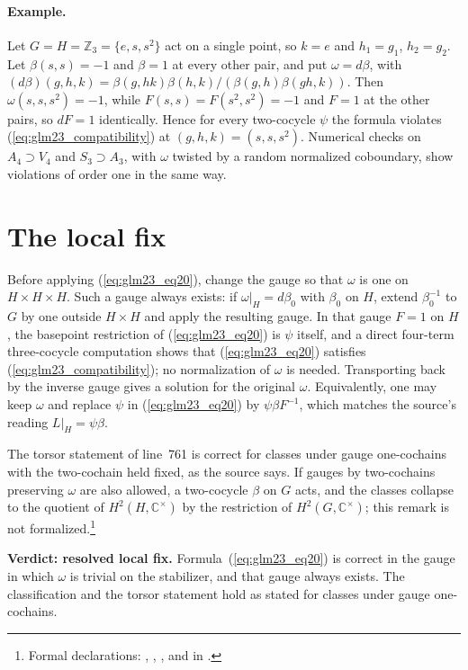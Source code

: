 \documentclass{article}
\begin{document}
\paragraph{Example.} Let $G=H=\mathbb Z_3=\{e,s,s^2\}$ act on a single
point, so $k=e$ and $h_1=g_1$, $h_2=g_2$. Let $\beta(s,s)=-1$ and
$\beta=1$ at every other pair, and put $\omega=d\beta$, with
$(d\beta)(g,h,k)=\beta(g,hk)\beta(h,k)/(\beta(g,h)\beta(gh,k))$. Then
$\omega(s,s,s^2)=-1$, while $F(s,s)=F(s^2,s^2)=-1$ and $F=1$ at the other
pairs, so $dF=1$ identically. Hence for every two-cocycle $\psi$ the
formula violates (\ref{eq:glm23_compatibility}) at $(g,h,k)=(s,s,s^2)$.
Numerical checks on $A_4\supset V_4$ and $S_3\supset A_3$, with $\omega$
twisted by a random normalized coboundary, show violations of order one in
the same way.

\section{The local fix}

Before applying (\ref{eq:glm23_eq20}), change the gauge so that
$\omega$ is one on $H\times H\times H$. Such a gauge always exists: if
$\omega|_H=d\beta_0$ with $\beta_0$ on $H$, extend $\beta_0^{-1}$ to $G$ by
one outside $H\times H$ and apply the resulting gauge. In that gauge
$F=1$ on $H$, the basepoint restriction of (\ref{eq:glm23_eq20}) is $\psi$
itself, and a direct four-term three-cocycle computation shows that
(\ref{eq:glm23_eq20}) satisfies (\ref{eq:glm23_compatibility}); no
normalization of $\omega$ is needed. Transporting back by the inverse
gauge gives a solution for the original $\omega$. Equivalently, one
may keep $\omega$ and replace $\psi$ in (\ref{eq:glm23_eq20}) by
$\psi\beta F^{-1}$, which matches the source's reading $L|_H=\psi\beta$.

The torsor statement of line~761 is correct for classes under
gauge one-cochains with the two-cochain held fixed, as the source says.
If gauges by two-cochains preserving $\omega$ are also allowed, a two-cocycle $\beta$
on $G$ acts, and the classes collapse to the quotient of
$H^2(H,\mathbb C^\times)$ by the restriction of
$H^2(G,\mathbb C^\times)$; this remark is not formalized.\footnote{Formal declarations:
,
,
,
 and
in .}

\textbf{Verdict: resolved local fix.} Formula~(\ref{eq:glm23_eq20}) is
correct in the gauge in which $\omega$ is trivial on the stabilizer,
and that gauge always exists. The classification and the torsor statement
hold as stated for classes under gauge one-cochains.



\end{document}
